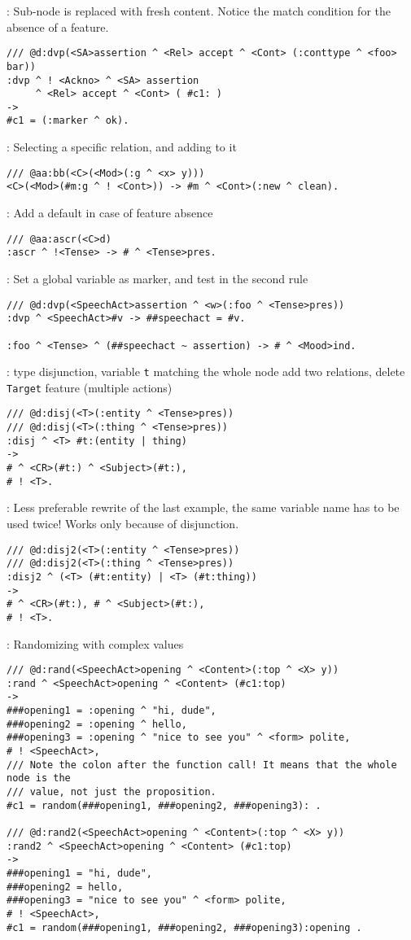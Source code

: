 : Sub-node is replaced with fresh content. Notice the match
condition for the absence of a feature.

\begin{verbatim}
/// @d:dvp(<SA>assertion ^ <Rel> accept ^ <Cont> (:conttype ^ <foo> bar))
:dvp ^ ! <Ackno> ^ <SA> assertion
     ^ <Rel> accept ^ <Cont> ( #c1: )
->
#c1 = (:marker ^ ok).
\end{verbatim}

: Selecting a specific relation, and adding to it
\begin{verbatim}
/// @aa:bb(<C>(<Mod>(:g ^ <x> y)))
<C>(<Mod>(#m:g ^ ! <Cont>)) -> #m ^ <Cont>(:new ^ clean).
\end{verbatim}

: Add a default in case of feature absence
\begin{verbatim}
/// @aa:ascr(<C>d)
:ascr ^ !<Tense> -> # ^ <Tense>pres.
\end{verbatim}

: Set a global variable as marker, and test in the second rule
\begin{verbatim}
/// @d:dvp(<SpeechAct>assertion ^ <w>(:foo ^ <Tense>pres))
:dvp ^ <SpeechAct>#v -> ##speechact = #v.

:foo ^ <Tense> ^ (##speechact ~ assertion) -> # ^ <Mood>ind.
\end{verbatim}


: type disjunction, variable \texttt{t} matching the whole node
add two relations, delete \texttt{Target} feature (multiple actions)
\begin{verbatim}
/// @d:disj(<T>(:entity ^ <Tense>pres))
/// @d:disj(<T>(:thing ^ <Tense>pres))
:disj ^ <T> #t:(entity | thing)
->
# ^ <CR>(#t:) ^ <Subject>(#t:),
# ! <T>.
\end{verbatim}

: Less preferable rewrite of the last example, the same variable
name has to be used twice! Works only because of disjunction.
\begin{verbatim}
/// @d:disj2(<T>(:entity ^ <Tense>pres))
/// @d:disj2(<T>(:thing ^ <Tense>pres))
:disj2 ^ (<T> (#t:entity) | <T> (#t:thing))
->
# ^ <CR>(#t:), # ^ <Subject>(#t:),
# ! <T>.
\end{verbatim}

: Randomizing with complex values
\begin{verbatim}
/// @d:rand(<SpeechAct>opening ^ <Content>(:top ^ <X> y))
:rand ^ <SpeechAct>opening ^ <Content> (#c1:top)
->
###opening1 = :opening ^ "hi, dude",
###opening2 = :opening ^ hello,
###opening3 = :opening ^ "nice to see you" ^ <form> polite,
# ! <SpeechAct>,
/// Note the colon after the function call! It means that the whole node is the
/// value, not just the proposition.
#c1 = random(###opening1, ###opening2, ###opening3): .

/// @d:rand2(<SpeechAct>opening ^ <Content>(:top ^ <X> y))
:rand2 ^ <SpeechAct>opening ^ <Content> (#c1:top)
->
###opening1 = "hi, dude",
###opening2 = hello,
###opening3 = "nice to see you" ^ <form> polite,
# ! <SpeechAct>,
#c1 = random(###opening1, ###opening2, ###opening3):opening .
\end{verbatim}

